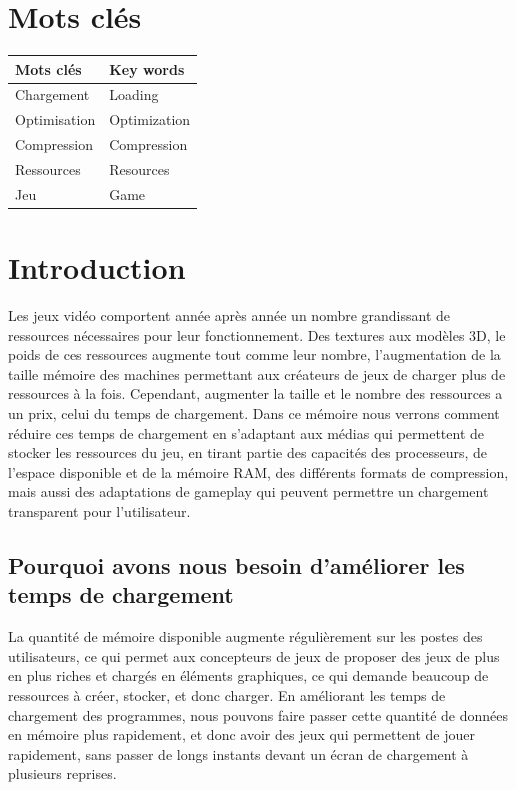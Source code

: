 \documentclass[a4paper, 12pt]{article} %
\begin{document}
\section{Mots clés}
\begin{center}
	\begin{tabular}{|p{}|p{}|}
		\hline
		Mots clés & Key words\\
		\hline
		Chargement&Loading\\
		Optimisation&Optimization\\
		Compression&Compression\\
		Ressources&Resources\\
		Jeu&Game\\
		\hline
	\end{tabular}
\end{center}

\newpage

\section{Introduction}
Les jeux vidéo comportent année après année un nombre grandissant de ressources nécessaires pour leur fonctionnement. Des textures aux modèles 3D, le poids de ces ressources augmente tout comme leur nombre, l'augmentation de la taille mémoire des machines permettant aux créateurs de jeux de charger plus de ressources à la fois. Cependant, augmenter la taille et le nombre des ressources a un prix, celui du temps de chargement. Dans ce mémoire nous verrons comment réduire ces temps de chargement en s'adaptant aux médias qui permettent de stocker les ressources du jeu, en tirant partie des capacités des processeurs, de l'espace disponible et de la mémoire RAM, des différents formats de compression, mais aussi des adaptations de gameplay qui peuvent permettre un chargement transparent pour l'utilisateur.

\subsection[Pourquoi améliorer les temps de chargement]{Pourquoi avons nous besoin d'améliorer les temps de chargement}
La quantité de mémoire disponible augmente régulièrement sur les postes des utilisateurs, ce qui permet aux concepteurs de jeux de proposer des jeux de plus en plus riches et chargés en éléments graphiques, ce qui demande beaucoup de ressources à créer, stocker, et donc charger. En améliorant les temps de chargement des programmes, nous pouvons faire passer cette quantité de données en mémoire plus rapidement, et donc avoir des jeux qui permettent de jouer rapidement, sans passer de longs instants devant un écran de chargement à plusieurs reprises.
\end{document}
